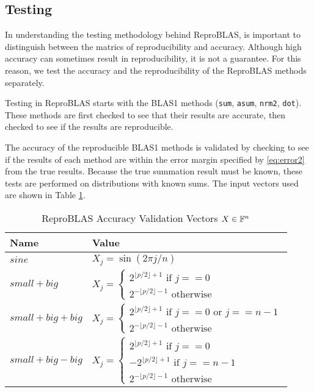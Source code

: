 \subsection{Testing}
  In understanding the testing methodology behind ReproBLAS, is important to distinguish between the matrics of reproducibility and accuracy. Although high accuracy can sometimes result in reproducibility, it is not a guarantee. For this reason, we test the accuracy and the reproducibility of the ReproBLAS methods separately.

  Testing in ReproBLAS starts with the BLAS1 methods (\texttt{sum}, \texttt{asum}, \texttt{nrm2}, \texttt{dot}). These methods are first checked to see that their results are accurate, then checked to see if the results are reproducible.

  The accuracy of the reproducible BLAS1 methods is validated by checking to see if the results of each method are within the error margin specified by \eqref{eq:error2} from the true results. Because the true summation result must be known, these tests are performed on distributions with known sums. The input vectors used are shown in Table \ref{tbl:validateblas1data}.

    \begin{table}[!htbp]
        \centering
        \begin{tabular}{ | l |  l |} \hline
            Name & Value\\ \hline
            $sine$ & $X_j = \sin(2 \pi j/n)$ \\ \hline
            $small + big$ & $X_j = \begin{cases} 2^{\lfloor p/2\rfloor + 1} \text{ if } j == 0 \\ 2^{-\lfloor p/2\rfloor - 1} \text{ otherwise} \end{cases}$ \\ \hline
            $small + big + big$ & $X_j = \begin{cases} 2^{\lfloor p/2\rfloor + 1} \text{ if } j == 0 \text{ or } j == n - 1 \\ 2^{-\lfloor p/2\rfloor - 1} \text{ otherwise} \end{cases}$\\ \hline
            $small + big - big$ & $X_j = \begin{cases} 2^{\lfloor p/2\rfloor + 1} \text{ if } j == 0\\-2^{\lfloor p/2\rfloor + 1} \text{ if } j == n - 1\\ 2^{-\lfloor p/2\rfloor - 1} \text{ otherwise} \end{cases}$\\ \hline
        \end{tabular}
        \caption{ReproBLAS Accuracy Validation Vectors $X \in \mathbb{F}^n$}
        \label{tbl:validateblas1data}
    \end{table}

